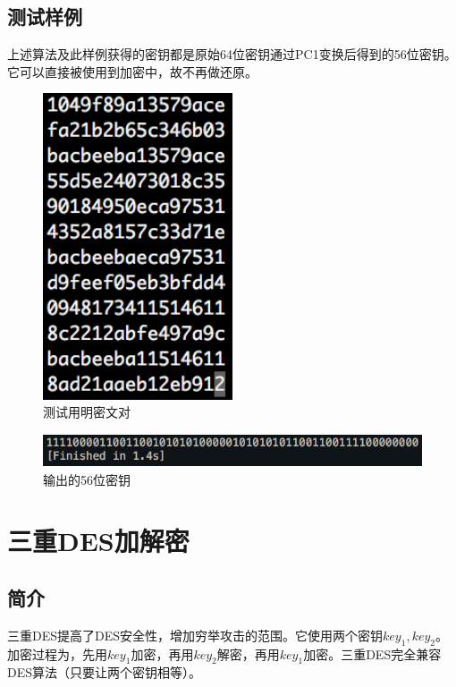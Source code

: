 \documentclass[11pt]{ctexart}
\begin{document}
\subsection{测试样例}
上述算法及此样例获得的密钥都是原始64位密钥通过PC1变换后得到的56位密钥。它可以直接被使用到加密中，故不再做还原。
\begin{figure}[htbp]
\centering
\includegraphics[height=9.06cm,width=5.61cm]{diff_src.png}
\caption{测试用明密文对}
\label{img_diff_src}
\end{figure}
\begin{figure}[htbp]
\centering
\includegraphics[height=0.98cm,width=11.66cm]{diff_key.png}
\caption{输出的56位密钥}
\label{img_diff_key}
\end{figure}

\newpage{}
\section{三重DES加解密}%
\subsection{简介}
三重DES提高了DES安全性，增加穷举攻击的范围。它使用两个密钥$key_1, key_2$。加密过程为，先用$key_1$加密，再用$key_2$解密，再用$key_1$加密。三重DES完全兼容DES算法（只要让两个密钥相等）。
\end{document}
